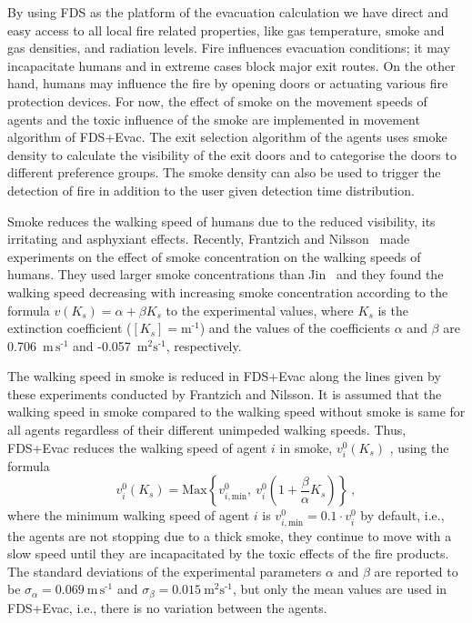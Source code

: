 \documentclass[12pt,a4paper,final,twoside]{stylevk}
\begin{document}
\noindent By using FDS as the platform of the evacuation calculation
we have direct and easy access to all local fire related properties,
like gas temperature, smoke and gas densities, and radiation levels.
Fire influences evacuation conditions; it may incapacitate humans and
in extreme cases block major exit routes.  On the other hand, humans
may influence the fire by opening doors or actuating various fire
protection devices.  For now, the effect of smoke on the movement
speeds of agents and the toxic influence of the smoke are implemented
in movement algorithm of FDS+Evac.  The exit selection algorithm of
the agents uses smoke density to calculate the visibility of the exit
doors and to categorise the doors to different preference groups.
The smoke density can also be used to trigger the detection of fire in
addition to the user given detection time distribution.


Smoke reduces the walking speed of humans due to the reduced
visibility, its irritating and asphyxiant effects.  Recently,
Frantzich and Nilsson~\cite{Frantzich03} made experiments on the
effect of smoke concentration on the walking speeds of humans.  They
used larger smoke concentrations than Jin~\cite{Jin78} and they found
the walking speed decreasing with increasing smoke concentration
according to the formula $v (K_s) = \alpha + \beta K_s $ to the
experimental values, where $K_s$ is the extinction coefficient ($[K_s]
\!\! = \!\!  \mathrm{ \textrm{m}^\textrm{-1} } $) and the values of
the coefficients $\alpha$ and $\beta$ are 0.706~$\mathrm{ \textrm{m}
  \, \textrm{s}^\textrm{-1} } $ and -0.057~$\mathrm{
  \textrm{m}^\textrm{2} \textrm{s}^\textrm{-1} } $, respectively.


The walking speed in smoke is reduced in FDS+Evac along the lines
given by these experiments conducted by Frantzich and Nilsson.  It is
assumed that the walking speed in smoke compared to the walking speed
without smoke is same for all agents regardless of their different
unimpeded walking speeds.  Thus, FDS+Evac reduces the walking speed of
agent $i$ in smoke, $v^0_i (K_s)$ , using the formula
%
\begin{equation}\label{Eq_SpeedSmoke}
  v^0_i (K_s) = \mathrm{Max} \left \{ v^0_{i,\mathrm{min}} ,~
  v^0_i \left ( 1 + \frac{\beta}{\alpha} K_s \right ) \right \} ~,
\end{equation}
%
where the minimum walking speed of agent $i$ is $ v^0_{i,\mathrm{min}}
= 0.1 \cdot v^0_i$ by default, i.e., the agents are not
stopping due to a thick smoke, they continue to move with a slow speed
until they are incapacitated by the toxic effects of the fire
products.  The standard deviations of the experimental parameters
$\alpha$ and $\beta$ are reported to be $\sigma_\alpha =
0.069~\mathrm{ \textrm{m} \, \textrm{s}^\textrm{-1} } $ and
$\sigma_\beta = 0.015~ \mathrm{ \textrm{m}^\textrm{2}
  \textrm{s}^\textrm{-1} } $, but only the mean values are used in
FDS+Evac, i.e., there is no variation between the agents.
\end{document}
